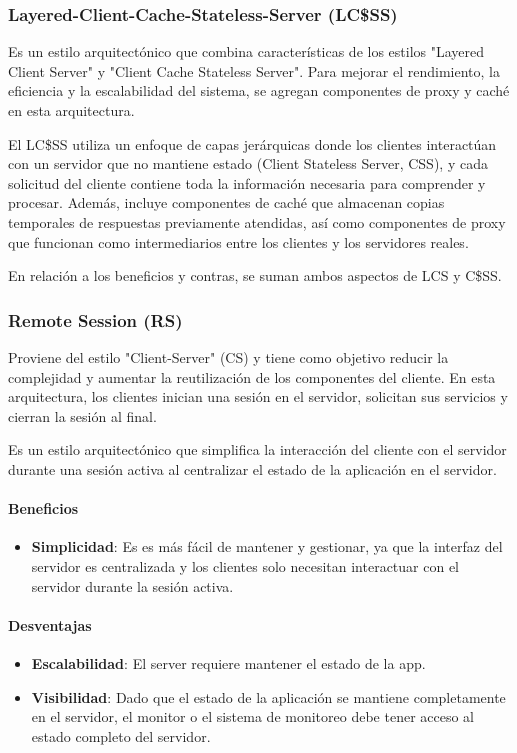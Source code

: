 \documentclass{article}
\begin{document}
		
		\subsubsection{Layered-Client-Cache-Stateless-Server (LC\$SS)}
		Es un estilo arquitectónico que combina características de los estilos "Layered Client Server" y "Client Cache Stateless Server". Para mejorar el rendimiento, la eficiencia y la escalabilidad del sistema, se agregan componentes de proxy y caché en esta arquitectura.
		
		El LC\$SS utiliza un enfoque de capas jerárquicas donde los clientes interactúan con un servidor que no mantiene estado (Client Stateless Server, CSS), y cada solicitud del cliente contiene toda la información necesaria para comprender y procesar. Además, incluye componentes de caché que almacenan copias temporales de respuestas previamente atendidas, así como componentes de proxy que funcionan como intermediarios entre los clientes y los servidores reales.
		
		En relación a los beneficios y contras, se suman ambos aspectos de LCS y C\$SS.
		
		\subsubsection{Remote Session (RS)}
		Proviene del estilo "Client-Server" (CS) y tiene como objetivo reducir la complejidad y aumentar la reutilización de los componentes del cliente. En esta arquitectura, los clientes inician una sesión en el servidor, solicitan sus servicios y cierran la sesión al final.
		
		Es un estilo arquitectónico que simplifica la interacción del cliente con el servidor durante una sesión activa al centralizar el estado de la aplicación en el servidor.
		
				
		\paragraph{Beneficios}
		\begin{itemize}	
			\item {\textbf{Simplicidad}}: Es es más fácil de mantener y gestionar, ya que la interfaz del servidor es centralizada y los clientes solo necesitan interactuar con el servidor durante la sesión activa.
			
		\end{itemize}
		
		\paragraph{Desventajas}
		\begin{itemize}	
			\item {\textbf{Escalabilidad}}: El server requiere mantener el estado de la app.
			
			\item {\textbf{Visibilidad}}: Dado que el estado de la aplicación se mantiene completamente en el servidor, el monitor o el sistema de monitoreo debe tener acceso al estado completo del servidor.
			
		\end{itemize}
		
\end{document}
